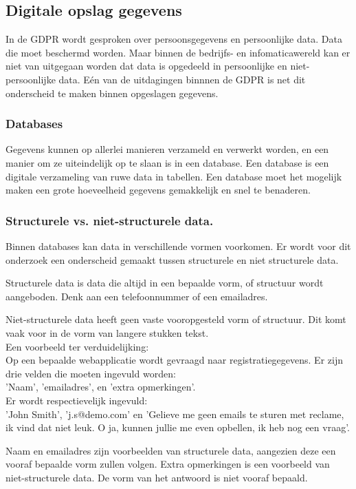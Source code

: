 \subsection{Digitale opslag gegevens}
In de GDPR wordt gesproken over persoonsgegevens en persoonlijke data. Data die moet beschermd worden. Maar binnen de bedrijfs- en infomaticawereld kan er niet van uitgegaan worden dat data is opgedeeld in persoonlijke en niet-persoonlijke data. Eén van de uitdagingen binnnen de GDPR is net dit onderscheid te maken binnen opgeslagen gegevens. \\

\subsubsection{Databases} 
Gegevens kunnen op allerlei manieren verzameld en verwerkt worden, en een manier om ze uiteindelijk op te slaan is in een database. Een database is een digitale verzameling van ruwe data in tabellen. Een database moet het mogelijk maken een grote hoeveelheid gegevens gemakkelijk en snel te benaderen. 

\subsubsection{Structurele vs. niet-structurele data.}
Binnen databases kan data in verschillende vormen voorkomen. Er wordt voor dit onderzoek een onderscheid gemaakt tussen structurele en niet structurele data. 

Structurele data is data die altijd in een bepaalde vorm, of structuur wordt aangeboden. Denk aan een telefoonnummer of een emailadres. 

Niet-structurele data heeft geen vaste vooropgesteld vorm of structuur. Dit komt vaak voor in de vorm van langere stukken tekst.\\

Een voorbeeld ter verduidelijking: \\
Op een bepaalde webapplicatie wordt gevraagd naar registratiegegevens. Er zijn drie velden die moeten ingevuld worden:\\ 'Naam', 'emailadres', en 'extra opmerkingen'. \\
Er wordt respectievelijk ingevuld: \\'John Smith', 'j.s@demo.com' en 'Gelieve me geen emails te sturen met reclame, ik vind dat niet leuk. O ja, kunnen jullie me even opbellen, ik heb nog een vraag'. 

Naam en emailadres zijn voorbeelden van structurele data, aangezien deze een vooraf bepaalde vorm zullen volgen. 
Extra opmerkingen is een voorbeeld van niet-structurele data. De vorm van het antwoord is niet vooraf bepaald. 

